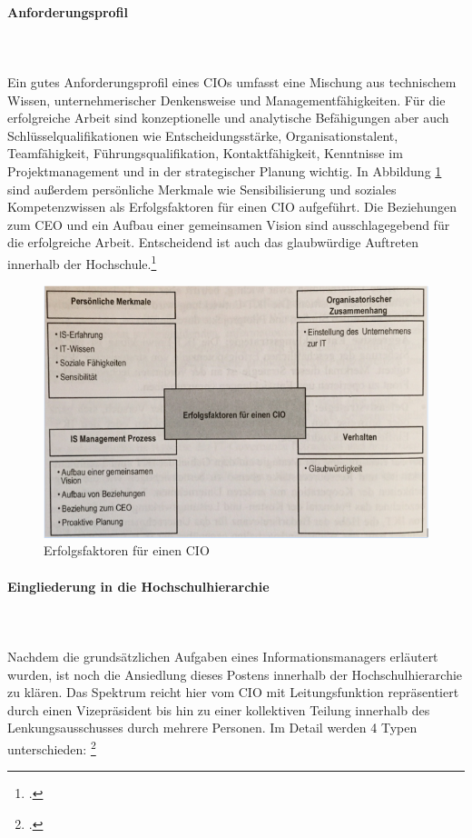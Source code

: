\paragraph{Anforderungsprofil}\mbox{}\\\\
Ein gutes Anforderungsprofil eines CIOs umfasst eine Mischung aus technischem Wissen, unternehmerischer Denkensweise und Managementfähigkeiten. Für die erfolgreiche Arbeit sind konzeptionelle und analytische Befähigungen aber auch Schlüsselqualifikationen wie Entscheidungsstärke, Organisationstalent, Teamfähigkeit, Führungsqualifikation, Kontaktfähigkeit, Kenntnisse im Projektmanagement und  in der strategischer Planung wichtig. In Abbildung \ref{efec} sind außerdem persönliche Merkmale wie Sensibilisierung und soziales Kompetenzwissen als Erfolgsfaktoren für einen CIO aufgeführt. Die Beziehungen zum CEO und ein Aufbau einer gemeinsamen Vision sind ausschlagegebend für die erfolgreiche Arbeit. Entscheidend ist auch das glaubwürdige Auftreten innerhalb der Hochschule.\footcite[Vgl.][150]{krcmar_einfuhrung_2015}

\begin{figure}[h!]
	\centering
	\includegraphics[width=15cm]{kapitel/gruppe1_2/bilder/erfolgsfaktoren_cio} 
	\caption{Erfolgsfaktoren für einen CIO\protect\footnotemark}
	\label{efec}
\end{figure}

\paragraph{Eingliederung in die Hochschulhierarchie}\mbox{}\\\\
Nachdem die grundsätzlichen Aufgaben eines Informationsmanagers erläutert wurden, ist noch die Ansiedlung dieses Postens innerhalb der Hochschulhierarchie zu klären. Das Spektrum reicht hier vom CIO mit Leitungsfunktion repräsentiert durch einen Vizepräsident bis hin zu einer kollektiven Teilung innerhalb des Lenkungsausschusses durch mehrere Personen. Im Detail werden 4 Typen unterschieden: \footcite[Vgl.][10]{leitner_itil_2008}

